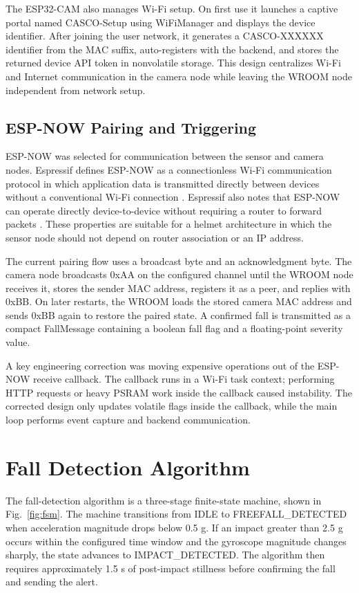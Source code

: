 \documentclass[conference]{IEEEtran}
\begin{document}
The ESP32-CAM also manages Wi-Fi setup. On first use it launches a captive portal named CASCO-Setup using WiFiManager and displays the device identifier. After joining the user network, it generates a CASCO-XXXXXX identifier from the MAC suffix, auto-registers with the backend, and stores the returned device API token in nonvolatile storage. This design centralizes Wi-Fi and Internet communication in the camera node while leaving the WROOM node independent from network setup.

\subsection{ESP-NOW Pairing and Triggering}
ESP-NOW was selected for communication between the sensor and camera nodes. Espressif defines ESP-NOW as a connectionless Wi-Fi communication protocol in which application data is transmitted directly between devices without a conventional Wi-Fi connection \cite{espressifespnow}. Espressif also notes that ESP-NOW can operate directly device-to-device without requiring a router to forward packets \cite{espressiffaq}. These properties are suitable for a helmet architecture in which the sensor node should not depend on router association or an IP address.

The current pairing flow uses a broadcast byte and an acknowledgment byte. The camera node broadcasts 0xAA on the configured channel until the WROOM node receives it, stores the sender MAC address, registers it as a peer, and replies with 0xBB. On later restarts, the WROOM loads the stored camera MAC address and sends 0xBB again to restore the paired state. A confirmed fall is transmitted as a compact FallMessage containing a boolean fall flag and a floating-point severity value.

A key engineering correction was moving expensive operations out of the ESP-NOW receive callback. The callback runs in a Wi-Fi task context; performing HTTP requests or heavy PSRAM work inside the callback caused instability. The corrected design only updates volatile flags inside the callback, while the main loop performs event capture and backend communication.

\section{Fall Detection Algorithm}
The fall-detection algorithm is a three-stage finite-state machine, shown in Fig.~\ref{fig:fsm}. The machine transitions from IDLE to FREEFALL\_DETECTED when acceleration magnitude drops below 0.5 g. If an impact greater than 2.5 g occurs within the configured time window and the gyroscope magnitude changes sharply, the state advances to IMPACT\_DETECTED. The algorithm then requires approximately 1.5 s of post-impact stillness before confirming the fall and sending the alert.
\end{document}
